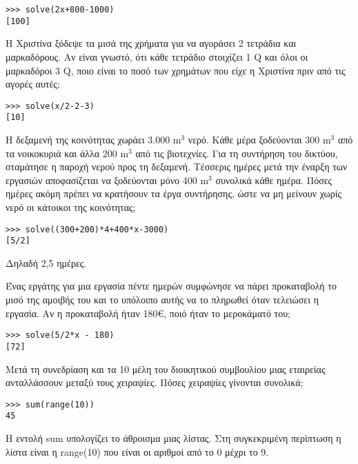 \begin{lstlisting}
>>> solve(2x+800-1000)
[100]
\end{lstlisting}
\begin{exercise}
Η Χριστίνα ξόδεψε τα μισά της χρήματα για να αγοράσει 2 τετράδια και μαρκαδόρους.
Αν είναι γνωστό, ότι κάθε τετράδιο στοιχίζει 1 Q και όλοι οι μαρκαδόροι 3 Q, ποιο είναι
το ποσό των χρημάτων που είχε η Χριστίνα πριν από τις αγορές αυτές;
\end{exercise}
\begin{lstlisting}
>>> solve(x/2-2-3)
[10]
\end{lstlisting}
\begin{exercise}
Η δεξαμενή της κοινότητας χωράει 3.000 m$^3$ νερό. Κάθε μέρα ξοδεύονται 300 m$^3$ από
τα νοικοκυριά και άλλα 200 m$^3$ από τις βιοτεχνίες. Για τη συντήρηση του δικτύου,
σταμάτησε η παροχή νερού προς τη δεξαμενή. Τέσσερις ημέρες μετά την έναρξη των
εργασιών αποφασίζεται να ξοδεύονται μόνο 400 m$^3$ συνολικά κάθε ημέρα. Πόσες
ημέρες ακόμη πρέπει να κρατήσουν τα έργα συντήρησης, ώστε να μη μείνουν χωρίς
νερό οι κάτοικοι της κοινότητας;
\end{exercise}
\begin{lstlisting}
>>> solve((300+200)*4+400*x-3000)
[5/2]
\end{lstlisting}
Δηλαδή 2,5 ημέρες.
\begin{exercise}
Ένας εργάτης για μια εργασία πέντε ημερών συμφώνησε να πάρει προκαταβολή το
μισό της αμοιβής του και το υπόλοιπο αυτής να το πληρωθεί όταν τελειώσει η εργασία.
Αν η προκαταβολή ήταν 180€, ποιό ήταν το μεροκάματό του;
\end{exercise}
\begin{lstlisting}
>>> solve(5/2*x - 180)
[72]
\end{lstlisting}

\begin{exercise}
Mετά τη συνεδρίαση και τα 10 μέλη του διοικητικού
συμβουλίου μιας εταιρείας ανταλλάσσουν μεταξύ
τους χειραψίες. Πόσες χειραψίες γίνονται συνολικά;
\end{exercise}
\begin{lstlisting}
>>> sum(range(10))
45
\end{lstlisting}
H εντολή sum υπολογίζει το άθροισμα μιας λίστας. Στη συγκεκριμένη περίπτωση η λίστα είναι η range(10) που είναι οι αριθμοί από το 0 μέχρι το 9.

